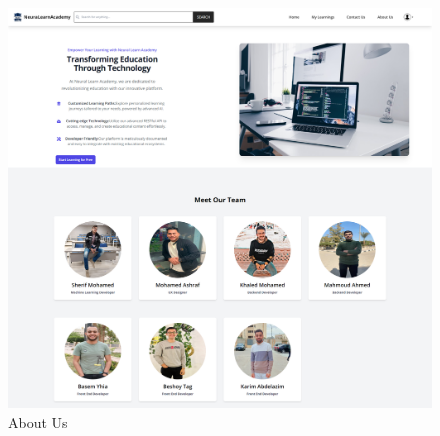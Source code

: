 \begin{figure}[h!]
	\centering
	\includegraphics[max height=\textheight,max width=\textwidth]{figures/frontend/about-us.png}
	\caption{About Us}
\end{figure}

